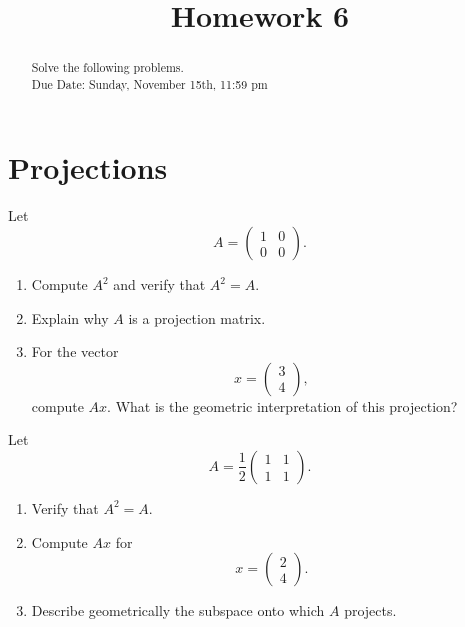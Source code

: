 \documentclass{ximera}
\begin{document}
    \title{Homework 6}
    
    \begin{abstract} Solve the following problems.
    \\
    Due Date: Sunday, November 15th, 11:59 pm
    \end{abstract}
    \maketitle

\section{Projections}
\begin{exercise}
Let
\[
A = \begin{pmatrix}
1 & 0\\
0 & 0
\end{pmatrix}.
\]
    
\begin{enumerate}
    \item Compute $A^2$ and verify that $A^2=A$.
    \item Explain why $A$ is a projection matrix.
    \item For the vector
    \[
    x = \begin{pmatrix} 3\\ 4 \end{pmatrix},
    \]
    compute $Ax$. What is the geometric interpretation of this projection?
\end{enumerate}

\end{exercise}


\begin{exercise}
Let
\[
A = \frac{1}{2}
\begin{pmatrix}
1 & 1\\
1 & 1
\end{pmatrix}.
\]

\begin{enumerate}
    \item Verify that $A^2=A$.
    \item Compute $Ax$ for
    \[
    x = \begin{pmatrix} 2\\ 4 \end{pmatrix}.
    \]
    \item Describe geometrically the subspace onto which $A$ projects.
\end{enumerate}

\end{exercise}
\end{document}
